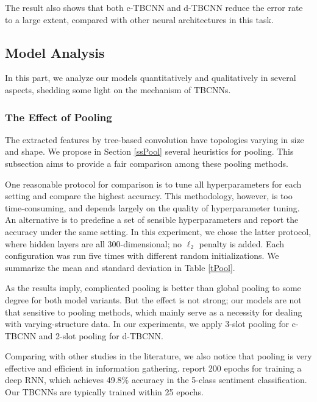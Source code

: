 \documentclass[11pt,a4paper]{article}
\begin{document}
The result also shows that both c-TBCNN and d-TBCNN reduce 
the error rate to a large extent, 
compared with other neural architectures in this task.

\subsection{Model Analysis}\label{ssModel}
In this part, we analyze our models quantitatively and qualitatively in several aspects,
shedding some light on the mechanism of TBCNNs.

\subsubsection{The Effect of Pooling}\label{sssPool}
The extracted features by tree-based convolution
have topologies varying in size and shape.
We propose in Section \ref{ssPool} several heuristics for pooling.
This subsection aims to provide a fair comparison among these pooling methods.

One reasonable protocol for comparison is to tune all hyperparameters for each setting and compare the
highest accuracy. This methodology, however, is too time-consuming, and
depends largely on the quality of hyperparameter tuning.
An alternative is to predefine a
set of sensible hyperparameters and report the accuracy under the same setting.
In this experiment, we chose the latter protocol,
where hidden layers are all 300-dimensional; no $\ell_2$ penalty is added.
Each configuration was run five times with different random initializations. We summarize 
the mean and
standard deviation in Table \ref{tPool}.


As the results imply, complicated pooling is better than global pooling to some degree
for both model variants.
But the effect is not strong; our models are not that sensitive to pooling methods, which mainly serve as a necessity for dealing with varying-structure data.
In our experiments, we apply 3-slot pooling for c-TBCNN and 2-slot pooling for d-TBCNN.

Comparing with other studies in the literature, 
we also notice that pooling is very effective and efficient 
in information gathering. 
 report 200 epochs for training a deep RNN, which achieves
49.8\% accuracy in the 5-class sentiment classification.
Our TBCNNs are typically trained within 25 epochs.
 
\end{document}
